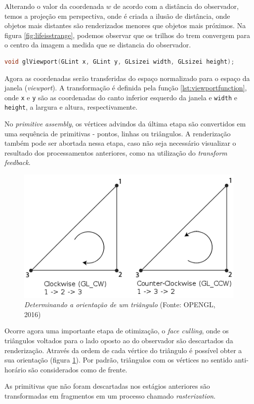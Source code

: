 Alterando o valor da coordenada $w$ de acordo com a distância do observador, temos a projeção em perspectiva, onde é criada a ilusão de distância, onde objetos mais distantes são renderizados menores que objetos mais próximos. Na figura \ref{fig:lifeisstrange}, podemos observar que os trilhos do trem convergem para o centro da imagem a medida que se distancia do observador.

\begin{lstlisting}[language=c,
label={lst:viewportfunction},
caption="Função glViewport"]
	void glViewport(GLint x, GLint y, GLsizei width, GLsizei height);
\end{lstlisting}

Agora as coordenadas serão transferidas do espaço normalizado para o espaço da janela (\textit{viewport}). A transformação é definida pela função \ref{lst:viewportfunction}, onde \lstinline{x} e \lstinline{y} são as coordenadas do canto inferior esquerdo da janela e \lstinline{width} e \lstinline{height}, a largura e altura, respectivamente.

No \textit{primitive assembly}, os vértices advindos da última etapa são convertidos em uma sequência de primitivas - pontos, linhas ou triângulos. A renderização também pode ser abortada nessa etapa, caso não seja necessário visualizar o resultado dos processamentos anteriores, como na utilização do \textit{transform feedback}.

\begin{figure}[H]
	\centering
	\includegraphics[scale=0.6]{imagens/triangle-winding.png}
	\caption{\small \textit{Determinando a orientação de um triângulo} (Fonte: OPENGL, 2016)}
	\label{fig:trianglewinding}
\end{figure}

Ocorre agora uma importante etapa de otimização, o \textit{face culling}, onde os triângulos voltados para o lado oposto ao do observador são descartados da renderização. Através da ordem de cada vértice do triângulo é possível obter a sua orientação (figura \ref{fig:trianglewinding}). Por padrão, triângulos com os vértices no sentido anti-horário são considerados como de frente.

As primitivas que não foram descartadas nos estágios anteriores são transformadas em fragmentos em um processo chamado \textit{rasterization}.

